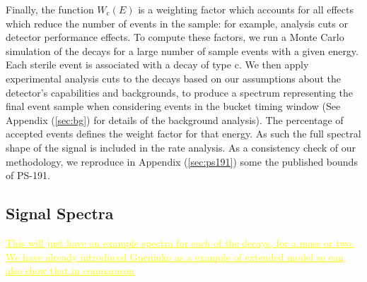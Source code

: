 \documentclass[11pt, a4paper]{article}
\newcommand{\newtext}[2]{\textcolor{#1}{\ul{#2}}}
\begin{document}
%
Finally, the function $W_\text{c}(E)$ is a weighting factor which accounts for
all effects which reduce the number of events in the sample: for example,
analysis cuts or detector performance effects.
%
To compute these factors, we run a Monte Carlo simulation of the decays for a
large number of sample events with a given energy. Each sterile event is
associated with a decay of type $\text{c}$. We then apply experimental analysis
cuts to the decays based on our assumptions about the detector's capabilities
and backgrounds, to produce a spectrum representing the final event sample when
considering events in the bucket timing window (See Appendix (\ref{sec:bg}) for
details of the background analysis). The percentage of accepted events defines
the weight factor for that energy. As such the full spectral shape of the
signal is included in the rate analysis. As a consistency check of our
methodology, we reproduce in Appendix (\ref{sec:ps191}) some the published
bounds of PS-191. 


\subsection{Signal Spectra}

\newtext{MARK}{This will just have an example spectra for each of the decays, for a mass or two. We have already introduced Gneninko as a example of extended model so can also show that in comparason}
\end{document}
